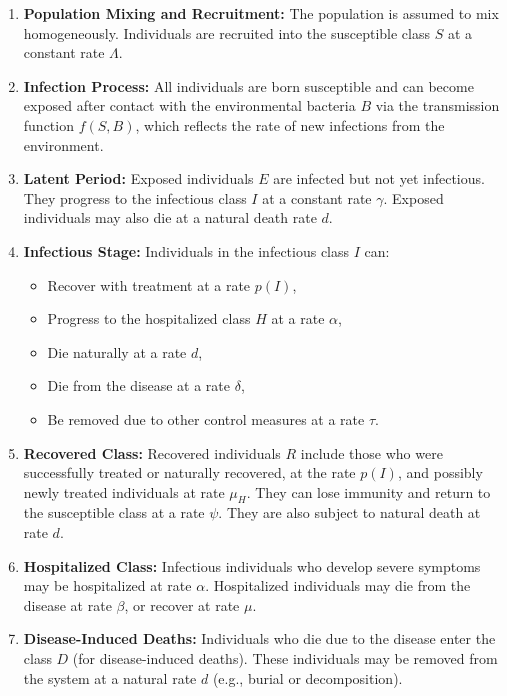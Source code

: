 \documentclass[a4paper,12pt]{report}
\begin{document}
\begin{enumerate}
    \item \textbf{Population Mixing and Recruitment:} The population is assumed to mix homogeneously. Individuals are recruited into the susceptible class \( S \) at a constant rate \( \Lambda \).
    
    \item \textbf{Infection Process:} All individuals are born susceptible and can become exposed after contact with the environmental bacteria \( B \) via the transmission function \( f(S, B) \), which reflects the rate of new infections from the environment.
    
    \item \textbf{Latent Period:} Exposed individuals \( E \) are infected but not yet infectious. They progress to the infectious class \( I \) at a constant rate \( \gamma \). Exposed individuals may also die at a natural death rate \( d \).
    
    \item \textbf{Infectious Stage:} Individuals in the infectious class \( I \) can:
    \begin{itemize}
        \item Recover with treatment at a rate \( p(I) \),
        \item Progress to the hospitalized class \( H \) at a rate \( \alpha \),
        \item Die naturally at a rate \( d \),
        \item Die from the disease at a rate \( \delta \),
        \item Be removed due to other control measures at a rate \( \tau \).
    \end{itemize}
    
    \item \textbf{Recovered Class:} Recovered individuals \( R \) include those who were successfully treated or naturally recovered, at the rate \( p(I) \), and possibly newly treated individuals at rate \( \mu_H \). They can lose immunity and return to the susceptible class at a rate \( \psi \). They are also subject to natural death at rate \( d \).
    
    \item \textbf{Hospitalized Class:} Infectious individuals who develop severe symptoms may be hospitalized at rate \( \alpha \). Hospitalized individuals may die from the disease at rate \( \beta \), or recover at rate \( \mu \).
    
    \item \textbf{Disease-Induced Deaths:} Individuals who die due to the disease enter the class \( D \) (for disease-induced deaths). These individuals may be removed from the system at a natural rate \( d \) (e.g., burial or decomposition).
    

\end{enumerate}
\end{document}
